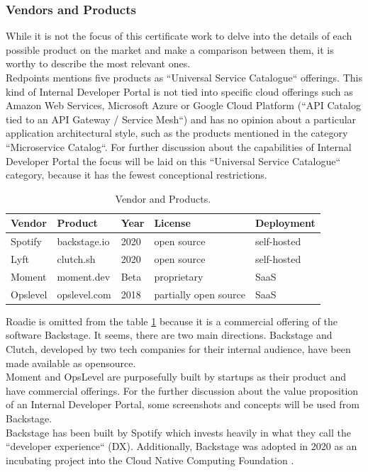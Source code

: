 \documentclass[a4paper,12pt]{article}
\begin{document}
    \subsubsection{Vendors and Products}
    \label{sssec:vendors}
    While it is not the focus of this certificate work to delve into the details of each possible product on the market
    and make a comparison between them, it is worthy to describe the most relevant ones.\\
    Redpoints mentions five products as ``Universal Service Catalogue`` offerings\parencite{devportalsprimer}.
    This kind of Internal Developer Portal is not tied into specific cloud offerings such as Amazon Web Services, Microsoft Azure or Google
    Cloud Platform (``API Catalog tied to an API Gateway / Service Mesh``) and has no opinion about a particular application
    architectural style, such as the products mentioned in the category ``Microservice Catalog``.
    For further discussion about the capabilities of Internal Developer Portal the focus will be laid on this
    ``Universal Service Catalogue`` category, because it has the fewest conceptional restrictions.\\
    \begin{table}[!htbp]
        \begin{center}
            \begin{tabularx}{\textwidth}{lllll}
                \toprule
                Vendor   & Product      & Year & License               & Deployment  \\
                \midrule
                Spotify  & backstage.io & 2020 & open source           & self-hosted \\
                Lyft     & clutch.sh    & 2020 & open source           & self-hosted \\
                Moment   & moment.dev   & Beta & proprietary           & SaaS        \\
                Opslevel & opslevel.com & 2018 & partially open source & SaaS        \\
                \bottomrule
            \end{tabularx}
            \caption{\label{tab:vendors} Vendor and Products.}
        \end{center}
    \end{table}
    \FloatBarrier
    Roadie is omitted from the table \ref{tab:vendors} because it is a commercial offering of the software Backstage.
    It seems, there are two main directions.
    Backstage and Clutch, developed by two tech companies for their internal audience, have been made
    available as opensource.\\
    Moment and OpsLevel are purposefully built by startups as their product and have commercial offerings.
    For the further discussion about the value proposition of an Internal Developer Portal, some screenshots and concepts will
    be used from Backstage.\\
    Backstage has been built by Spotify which invests heavily in what they call the
    ``developer experience`` (DX)\parencite{spotifydx}.
    Additionally, Backstage was adopted in 2020 as an incubating project into the Cloud Native Computing Foundation\parencite{cncf} .
\end{document}

